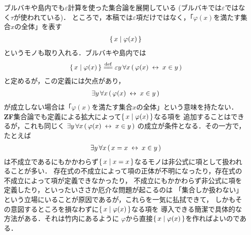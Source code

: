 	ブルバキ\cite{key5}や島内\cite{key6}でも$\varepsilon$計算を使った集合論を展開している
	(ブルバキ\cite{key5}では$\varepsilon$ではなく$\tau$が使われている)．
	ところで，本稿では$\varepsilon$項だけではなく，「$\varphi(x)$を満たす集合$x$の全体」を表す
	\begin{align}
		\{\, x \mid \varphi(x)\, \}
	\end{align}
	というモノも取り入れる．ブルバキ\cite{key5}や島内\cite{key6}では
	\begin{align}
		\Set{x}{\varphi(x)} \defeq \varepsilon y\, \forall x\, 
		(\, \varphi(x) \lrarrow x \in y\, )
	\end{align}
	と定めるが，この定義には欠点があり，
	\begin{align}
		\exists y\, \forall x\, (\, \varphi(x) \hspace{0.25em}\leftrightarrow\hspace{0.25em} x \in y\, )
	\end{align}
	が成立しない場合は「$\varphi(x)$を満たす集合$x$の全体」という意味を持たない．
	{\bf ZF}集合論でも定義による拡大によって$\{\, x \mid \varphi(x)\, \}$なる項を
	追加することはできるが，これも同じく
	$\exists y\, \forall x\, (\, \varphi(x) \hspace{0.25em}\leftrightarrow\hspace{0.25em} x \in y\, )$
	の成立が条件となる．その一方で，たとえば%
	\begin{align}
		\exists y\, \forall x\, (\, x = x \hspace{0.25em}\leftrightarrow\hspace{0.25em} x \in y\, )
	\end{align}
	は不成立であるにもかかわらず$\{\, x \mid x = x\, \}$なるモノは非公式に項として扱われることが多い．
	存在式の不成立によって項の正体が不明になったり，存在式の不成立によって項が定義できなかったり，
	不成立にもかかわらず非公式に項を定義したり，といったいささか厄介な問題が起こるのは
	「集合しか扱わない」という立場にいることが原因であるが，これらを一気に払拭できて，
	しかもその意図するところを損なわずに$\{\, x \mid \varphi(x)\, \}$なる項を
	導入できる簡潔で具体的な方法がある．それは竹内\cite{key4}にあるように
	$\varphi$から直接$\{\, x \mid \varphi(x)\, \}$を作ればよいのである．
	
